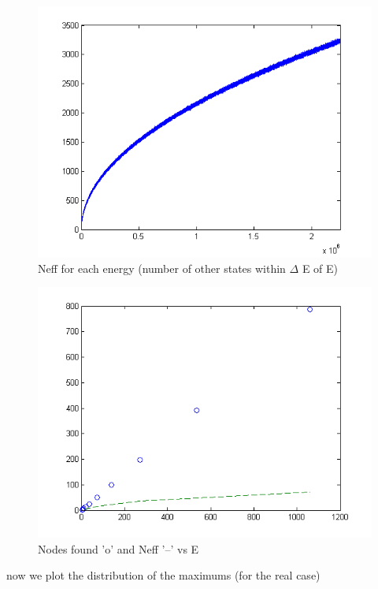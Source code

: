 \documentclass[12pt]{article}
\begin{document}
\begin{figure}[hpt]
	\centering
		\includegraphics[width=1.00\textwidth]{notes2/EvsNeff.png}
	\caption{Neff for each energy (number of other states within $\Delta$ E of E)}
	\label{fig:neff}
\end{figure}

\begin{figure}[hpt]
	\centering
		\includegraphics[width=1.00\textwidth]{notes3/nodeavgVsE_deltaEVsE.png}
	\caption{Nodes found 'o' and Neff '--' vs E}
	\label{fig:nodeavgVsE_deltaEVsE}
\end{figure}

\pagebreak

now we plot the distribution of the maximums (for the real case)
\end{document}
